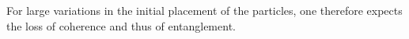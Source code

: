 For large variations in the initial placement of the particles, one therefore expects the loss of coherence and thus of entanglement.

